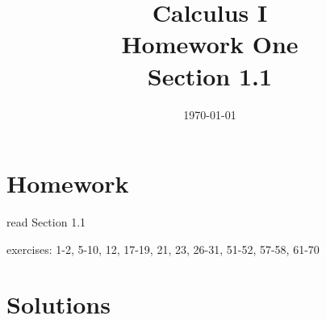 \documentclass[letterpaper, landscape]{exam}
\title{Calculus I \\ Homework One \\ Section 1.1}
\author{}
\date{\today}
\begin{document}
  \maketitle

  \section{Homework}
    \begin{itemize*}
      \item read Section 1.1
      \item exercises: 1-2, 5-10, 12, 17-19, 21, 23, 26-31, 51-52, 57-58, 61-70
    \end{itemize*}

  \ifprintanswers
    \section{Solutions}
\end{document}

